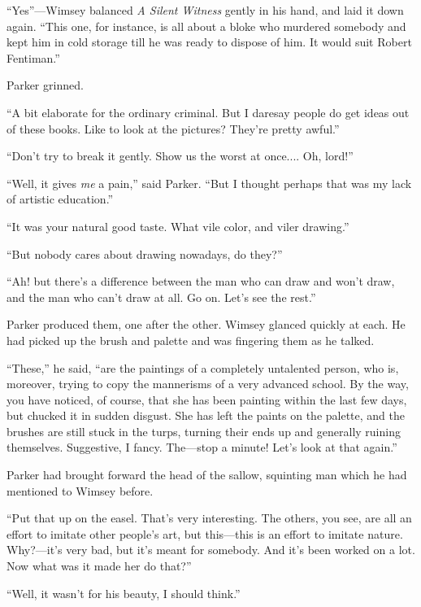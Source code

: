 \enquote{Yes}---Wimsey balanced \textit{A Silent Witness} gently in his hand, and laid it down again. \enquote{This one, for instance, is all about a bloke who murdered somebody and kept him in cold storage till he was ready to dispose of him. It would suit Robert Fentiman.}

Parker grinned.

\enquote{A bit elaborate for the ordinary criminal. But I daresay people do get ideas out of these books. Like to look at the pictures? They're pretty awful.}

\enquote{Don't try to break it gently. Show us the worst at once.... Oh, lord!}

\enquote{Well, it gives \textit{me} a pain,} said Parker. \enquote{But I thought perhaps that was my lack of artistic education.}

\enquote{It was your natural good taste. What vile color, and viler drawing.}

\enquote{But nobody cares about drawing nowadays, do they?}

\enquote{Ah! but there's a difference between the man who can draw and won't draw, and the man who can't draw at all. Go on. Let's see the rest.}

Parker produced them, one after the other. Wimsey glanced quickly at each. He had picked up the brush and palette and was fingering them as he talked.

\enquote{These,} he said, \enquote{are the paintings of a completely untalented person, who is, moreover, trying to copy the mannerisms of a very advanced school. By the way, you have noticed, of course, that she has been painting within the last few days, but chucked it in sudden disgust. She has left the paints on the palette, and the brushes are still stuck in the turps, turning their ends up and generally ruining themselves. Suggestive, I fancy. The\allowbreak---\allowbreak stop a minute! Let's look at that again.}

Parker had brought forward the head of the sallow, squinting man which he had mentioned to Wimsey before.

\enquote{Put that up on the easel. That's very interesting. The others, you see, are all an effort to imitate other people's art, but this\allowbreak---\allowbreak this is an effort to imitate nature. Why?---it's very bad, but it's meant for somebody. And it's been worked on a lot. Now what was it made her do that?}

\enquote{Well, it wasn't for his beauty, I should think.}

